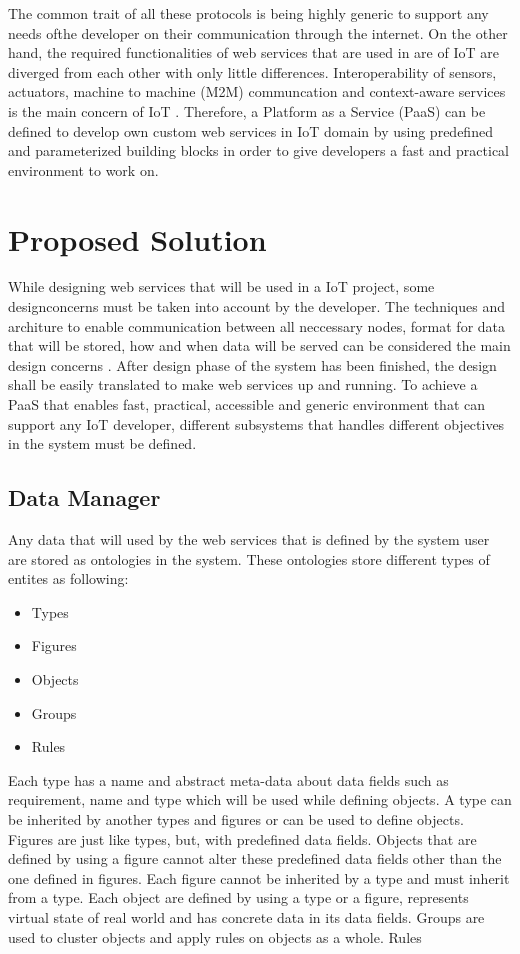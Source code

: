  The common trait of all these protocols is being highly generic to support any needs ofthe developer on their communication through the internet. On the other hand, the required functionalities of web services that are used in are of IoT are diverged from each other with only little differences. Interoperability of sensors, actuators, machine to machine (M2M) communcation and context-aware services is the main concern of IoT \cite{6651222}. Therefore, a Platform as a Service (PaaS) can be defined to develop own custom web services in IoT domain by using predefined and parameterized building blocks in order to give developers a fast and practical environment to work on.

\section{Proposed Solution}

While designing web services that will be used in a IoT project, some designconcerns must be taken into account by the developer. The techniques and architure to enable communication between all neccessary nodes, format for data that will be stored, how and when data will be served can be considered the main design concerns \cite{6651222}. After design phase of the system has been finished, the design shall be easily translated to make web services up and running. To achieve a PaaS that enables fast, practical, accessible and generic environment that can support any IoT developer, different subsystems that handles different objectives in the system must be defined.

\subsection{Data Manager}

Any data that will used by the web services that is defined by the system user are stored as ontologies in the system. These ontologies store different types of entites as following:

\begin{itemize}
  \item Types
  \item Figures
  \item Objects
  \item Groups
  \item Rules
\end{itemize}

Each type has a name and abstract meta-data about data fields such as requirement, name and type which will be used while defining objects. A type can be inherited by another types and figures or can be used to define objects. Figures are just like types, but, with predefined data fields. Objects that are defined by using a figure cannot alter these predefined data fields other than the one defined in figures. Each figure cannot be inherited by a type and must inherit from a type. Each object are defined by using a type or a figure, represents virtual state of real world and has concrete data in its data fields. Groups are used to cluster objects and apply rules on objects as a whole. Rules %

